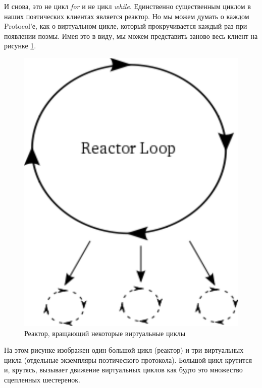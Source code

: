 И снова, это не цикл \textit{for} и не цикл \textit{while}. 
Единственно существенным циклом в наших поэтических клиентах 
является реактор. Но мы можем думать о каждом Protocol'е, 
как о виртуальном цикле, который прокручивается каждый раз 
при появлении поэмы. Имея это в виду, мы можем представить 
заново весь клиент на рисунке \ref{fig:reactor-3}. 

\begin{figure}[h]
\begin{center}
    \includegraphics[height=0.3\textheight]{images/reactor-3.pdf}
    \caption{Реактор, вращающий некоторые виртуальные циклы\label{fig:reactor-3}}
\end{center}
\end{figure}


На этом рисунке изображен один большой цикл (реактор) и 
три виртуальных цикла (отдельные экземпляры поэтического протокола). 
Большой цикл крутится и, крутясь, вызывает движение виртуальных 
циклов как будто это множество сцепленных шестеренок.  


